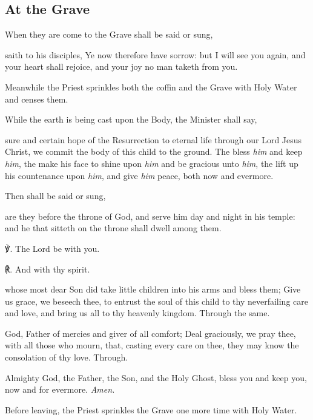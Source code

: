 \subsection{At the Grave}
\begin{rubric}
    When they are come to the Grave shall be said or sung,
\end{rubric}
 saith to his disciples, Ye now therefore have sorrow: but I will see you again, and your heart shall rejoice, and your joy no man taketh from you.

\begin{rubric}
    Meanwhile the Priest sprinkles both the coffin and the Grave with Holy Water and censes them.\par
    While the earth is being cast upon the Body, the Minister shall say,
\end{rubric}\par

 sure and certain hope of the Resurrection to eternal life through our Lord Jesus Christ, we commit the body of this child to the ground. The  bless \textit{him} and keep \textit{him}, the  make his face to shine upon \textit{him} and be gracious unto \textit{him}, the  lift up his countenance upon \textit{him}, and give \textit{him} peace, both now and evermore.

\begin{rubric}
    Then shall be said or sung,
\end{rubric}

 are they before the throne of God, and serve him day and night in his temple: and he that sitteth on the throne shall dwell among them.\par

℣. The Lord be with you.

℟. And with thy spirit.

{} whose most dear Son did take little children into his arms and bless them; Give us grace, we beseech thee, to entrust the soul of this child to thy neverfailing care and love, and bring us all to thy heavenly kingdom. Through the same.\par

 God, Father of mercies and giver of all comfort; Deal graciously, we pray thee, with all those who mourn, that, casting every care on thee, they may know the consolation of thy love. Through.\par

 Almighty God, the Father, the {} Son, and the Holy Ghost, bless you and keep you, now and for evermore. \textit{Amen.}


\begin{rubric}
    Before leaving, the Priest sprinkles the Grave one more time with Holy Water.
\end{rubric}